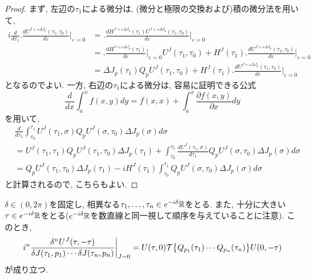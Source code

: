 \begin{proof}
  まず, 左辺の$\tau_1$による微分は, (微分と極限の交換および)積の微分法を用いて,
  \begin{align*}
    i\frac{d}{d\tau_1}\biggl.\frac{d U^{J+\varepsilon\Delta J_p}(\tau_1,\tau_0)}{d\varepsilon}\biggr|_{\varepsilon=0} &=
    \biggl.\frac{d H^{J+\varepsilon \Delta J_p}(\tau_1)U^{J+\varepsilon\Delta J_p}(\tau_1,\tau_0)}{d\varepsilon}\biggr|_{\varepsilon=0} \\ &=
    \biggl.\frac{d H^{J+\varepsilon \Delta J_p}(\tau_1)}{d\varepsilon}\biggr|_{\varepsilon=0}U^{J}(\tau_1,\tau_0) +
    H^{J}(\tau_1)\biggl.\frac{d U^{J+\varepsilon\Delta J_p}(\tau_1,\tau_0)}{d\varepsilon}\biggr|_{\varepsilon=0} \\ &=
    \Delta J_p(\tau_1)Q_p U^J(\tau_1,\tau_0) +
    H^{J}(\tau_1)\biggl.\frac{d U^{J+\varepsilon\Delta J_p}(\tau_1,\tau_0)}{d\varepsilon}\biggr|_{\varepsilon=0}
  \end{align*}
  となるのでよい.
  一方, 右辺の$\tau_1$による微分は, 容易に証明できる公式
  \begin{equation}
    \frac{d}{dx}\int_a^{x}f(x, y)dy = f(x,x)+\int_{a}^{x}\frac{\partial f(x,y)}{\partial x}dy
  \end{equation}
  を用いて,
  \begin{align*}
    &
    \frac{d}{d\tau_1}\int_{\tau_0}^{\tau_1}U^J(\tau_1,\sigma)Q_pU^J(\sigma,\tau_0)\Delta J_p(\sigma)d\sigma \\
    &=
    U^J(\tau_1,\tau_1)Q_pU^J(\tau_1,\tau_0)\Delta J_p(\tau_1)+
    \int_{\tau_0}^{\tau_1}\frac{dU^J(\tau_1,\sigma)}{d\tau_1}Q_pU^J(\sigma,\tau_0)\Delta J_p(\sigma)d\sigma \\
    &=
    Q_pU^J(\tau_1,\tau_0)\Delta J_p(\tau_1)-i
    H^J(\tau_1)\int_{\tau_0}^{\tau_1}Q_pU^J(\sigma,\tau_0)\Delta J_p(\sigma)d\sigma
  \end{align*}
  と計算されるので, こちらもよい.
\end{proof}

\begin{thm}
  $\delta \in (0, 2\pi)$を固定し,
  相異なる$\tau_1, \ldots, \tau_n \in e^{-i\delta}\mathbb{R}$をとる.
  また, 十分に大きい$\tau \in e^{-i\delta}\mathbb{R}$をとる($e^{-i\delta}\mathbb{R}$を数直線と同一視して順序を与えていることに注意).
  このとき,
  \begin{equation}
    \biggl. i^n \frac{\delta^n U^J(\tau, -\tau)}{\delta J(\tau_1,p_1) \cdots \delta J(\tau_n,p_n)}\biggr|_{J = 0} =
    U(\tau, 0) \mathcal{T} \bigl\{ Q_{p_1}(\tau_1)\cdots Q_{p_n}(\tau_n) \bigr\} U(0, -\tau)
  \end{equation}
  が成り立つ.
\end{thm}

